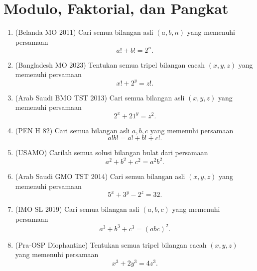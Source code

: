 \documentclass[12pt]{scrartcl}
\begin{document}
\section{Modulo, Faktorial, dan Pangkat}
\begin{enumerate}[resume]

	\item (Belanda MO 2011)
	Cari semua bilangan asli $(a, b, n)$ yang memenuhi persamaan
	\[ a! + b! = 2^n. \]

	\item (Bangladesh MO 2023)
	Tentukan semua tripel bilangan cacah $(x, y, z)$ yang memenuhi persamaan
	\[ x! + 2^y = z!. \]

	\item (Arab Saudi BMO TST 2013)
	Cari semua bilangan asli $(x, y, z)$ yang memenuhi persamaan
	\[ 2^x + 21^y = z^2. \]

	\item (PEN H 82)
	Cari semua bilangan asli $a, b, c$ yang memenuhi persamaan
	\[ a!b! = a! + b! + c!. \]

	\item (USAMO)
	Carilah semua solusi bilangan bulat dari persamaan
	\[ a^2 + b^2 + c^2 = a^2b^2. \]

	\item (Arab Saudi GMO TST 2014)
	Cari semua bilangan asli $(x, y, z)$ yang memenuhi persamaan
	\[ 5^x + 3^y - 2^z = 32. \]

	\item (IMO SL 2019)
	Cari semua bilangan asli $(a, b, c)$ yang memenuhi persamaan
	\[ a^3 + b^3 + c^3 = (abc)^2. \]

	\item (Pra-OSP Diophantine)
	Tentukan semua tripel bilangan cacah $(x, y, z)$ yang memenuhi persamaan
	\[ x^3 + 2y^3 = 4z^3. \]

\end{enumerate}
\end{document}
